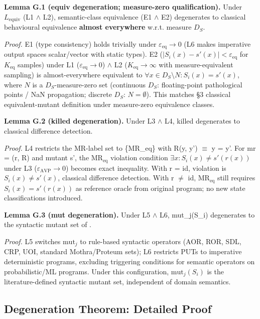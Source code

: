 \documentclass[manuscript,screen,review]{acmart}
\begin{document}
\textbf{Lemma G.1 (equiv degeneration; measure-zero
qualification).} Under $L_{\mathrm{equiv}}$ (L1 $\wedge$ L2), semantic-class equivalence
(E1 $\wedge$ E2) degenerates to classical behavioural equivalence
\textbf{almost everywhere} w.r.t. measure $D_S$.

\emph{Proof.} E1 (type consistency) holds trivially under $\varepsilon_{\mathrm{eq}} \to 0$ (L6
makes imperative output spaces scalar/vector with static types). E2
($|S_i(x) - s'(x)| < \varepsilon_{\mathrm{eq}}$ for $K_{\mathrm{eq}}$ samples)
under L1 ($\varepsilon_{\mathrm{eq}} \to 0$) $\wedge$ L2 ($K_{\mathrm{eq}} \to \infty$ with measure-equivalent sampling)
is almost-everywhere equivalent to $\forall x \in D_S \setminus N: S_i(x) = s'(x)$, where
$N$ is a $D_S$-measure-zero set (continuous $D_S$: floating-point
pathological points / NaN propagation; discrete $D_S$: $N = \emptyset$). This
matches \citet{d7c38286734419b52de4262c9802ebdfcf4b9447} §3 classical equivalent-mutant definition
under measure-zero equivalence classes.

\textbf{Lemma G.2 (killed degeneration).} Under L3 $\wedge$ L4, killed
degenerates to classical difference detection.

\emph{Proof.} L4 restricts the MR-label set to \{MR\_eq\} with R(y, y') $\equiv$ y = y'. For
mr = (r, R) and mutant s', the $\mathrm{MR}_{\mathrm{eq}}$ violation condition $\exists x: S_i(x) \neq
s'(r(x))$ under L3 ($\varepsilon_{\mathrm{AVP}} \to 0$) becomes exact inequality. With r = id,
violation is $S_i(x) \neq s'(x)$, classical difference detection. With r
$\neq$ id, $\mathrm{MR}_{\mathrm{eq}}$ still requires $S_i(x) = s'(r(x))$ as reference oracle from
original program; no new state classifications introduced.

\textbf{Lemma G.3 (mut degeneration).} Under L5 $\wedge$ L6, mut\_j(S\_i)
degenerates to the syntactic mutant set of \citet{d7c38286734419b52de4262c9802ebdfcf4b9447}.

\emph{Proof.} L5 switches $\mathrm{mut}_j$ to rule-based syntactic operators (AOR,
ROR, SDL, CRP, UOI, standard Mothra/Proteum sets); L6 restricts PUTs
to imperative deterministic programs, excluding triggering conditions
for semantic operators on probabilistic/ML programs. Under this
configuration, $\mathrm{mut}_j(S_i)$ is the literature-defined syntactic mutant
set, independent of domain semantics.

\subsection{Degeneration Theorem: Detailed Proof}\label{g.4-theorem-9.1-detailed-proof}
\end{document}
